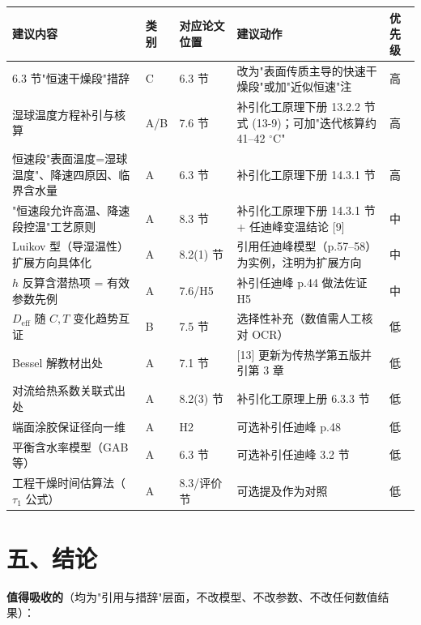 \documentclass[12pt,a4paper]{ctexart}
\begin{document}
\begin{center}
{\begin{tabular}{p{4.6cm}p{1.9cm}p{3.2cm}p{3.6cm}p{1.3cm}}
\toprule
建议内容 & 类别 & 对应论文位置 & 建议动作 & 优先级 \\
\midrule
6.3 节"恒速干燥段"措辞 & C & 6.3 节 & 改为"表面传质主导的快速干燥段"或加"近似恒速"注 & 高 \\
湿球温度方程补引与核算 & A/B & 7.6 节 & 补引化工原理下册 13.2.2 节式 (13-9)；可加"迭代核算约 41--42 $^\circ$C" & 高 \\
恒速段"表面温度=湿球温度"、降速四原因、临界含水量 & A & 6.3 节 & 补引化工原理下册 14.3.1 节 & 高 \\
"恒速段允许高温、降速段控温"工艺原则 & A & 8.3 节 & 补引化工原理下册 14.3.1 节 + 任迪峰变温结论 [9] & 中 \\
Luikov 型（导湿温性）扩展方向具体化 & A & 8.2(1) 节 & 引用任迪峰模型（p.57--58）为实例，注明为扩展方向 & 中 \\
$h$ 反算含潜热项 = 有效参数先例 & A & 7.6/H5 & 补引任迪峰 p.44 做法佐证 H5 & 中 \\
$D_{\mathrm{eff}}$ 随 $C,T$ 变化趋势互证 & B & 7.5 节 & 选择性补充（数值需人工核对 OCR） & 低 \\
Bessel 解教材出处 & A & 7.1 节 & [13] 更新为传热学第五版并引第 3 章 & 低 \\
对流给热系数关联式出处 & A & 8.2(3) 节 & 补引化工原理上册 6.3.3 节 & 低 \\
端面涂胶保证径向一维 & A & H2 & 可选补引任迪峰 p.48 & 低 \\
平衡含水率模型（GAB 等） & A & 6.3 节 & 可选补引任迪峰 3.2 节 & 低 \\
工程干燥时间估算法（$\tau_1$ 公式） & A & 8.3/评价节 & 可选提及作为对照 & 低 \\
\bottomrule
\end{tabular}}
\end{center}

\section{五、结论}

\textbf{值得吸收的}（均为"引用与措辞"层面，不改模型、不改参数、不改任何数值结果）：
\end{document}
